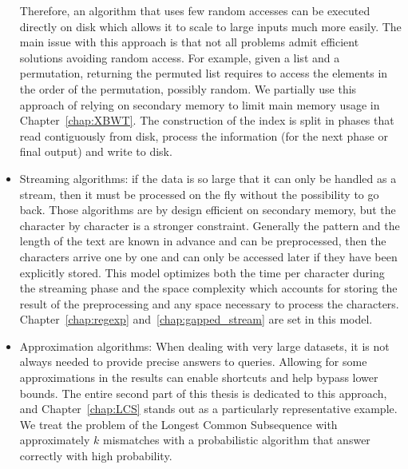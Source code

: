 \begin{itemize}
Therefore, an algorithm that uses few random accesses can be executed directly on disk which allows it to scale to large inputs much more easily. The main issue with this approach is that not all problems admit efficient solutions avoiding random access. For example, given a list and a permutation, returning the permuted list requires to access the elements in the order of the permutation, possibly random. We partially use this approach of relying on secondary memory to limit main memory usage in Chapter~\ref{chap:XBWT}. The construction of the index is split in phases that read contiguously from disk, process the information (for the next phase or final output) and write to disk.
\item Streaming algorithms: if the data is so large that it can only be handled as a stream, then it must be processed on the fly without the possibility to go back. Those algorithms are by design efficient on secondary memory, but the character by character is a stronger constraint. Generally the pattern and the length of the text are known in advance and can be preprocessed, then the characters arrive one by one and can only be accessed later if they have been explicitly stored. This model optimizes both the time per character during the streaming phase and the space complexity which accounts for storing the result of the preprocessing and any space necessary to process the characters. Chapter~\ref{chap:regexp} and~\ref{chap:gapped_stream} are set in this model.
\item Approximation algorithms: When dealing with very large datasets, it is not always needed to provide precise answers to queries. Allowing for some approximations in the results can enable shortcuts and help bypass lower bounds.
The entire second part of this thesis is dedicated to this approach, and Chapter~\ref{chap:LCS} stands out as a particularly representative example. We treat the problem of the Longest Common Subsequence with approximately $k$ mismatches with a probabilistic algorithm that answer correctly with high probability. %
\end{itemize}
